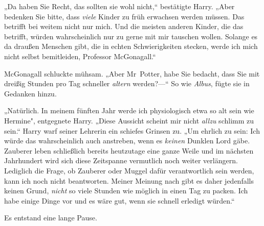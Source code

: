 „Da haben Sie Recht, das sollten sie wohl nicht,“ bestätigte Harry. „Aber bedenken Sie bitte, dass \emph{viele} Kinder zu früh erwachsen werden müssen. Das betrifft bei weitem nicht nur mich. Und die meisten anderen Kinder, die das betrifft, würden wahrscheinlich nur zu gerne mit mir tauschen wollen. Solange es da draußen Menschen gibt, die in echten Schwierigkeiten stecken, werde ich mich nicht selbst bemitleiden, Professor McGonagall.“

McGonagall schluckte mühsam. „Aber Mr~Potter, habe Sie bedacht, dass Sie mit dreißig Stunden pro Tag schneller \emph{altern} werden?—“ So wie \emph{Albus}, fügte sie in Gedanken hinzu.

„Natürlich. In meinem fünften Jahr werde ich physiologisch etwa so alt sein wie Hermine", entgegnete Harry. „Diese Aussicht scheint mir nicht \emph{allzu} schlimm zu sein.“ Harry warf seiner Lehrerin ein schiefes Grinsen zu. „Um ehrlich zu sein: Ich würde das wahrscheinlich auch anstreben, wenn es \emph{keinen} Dunklen Lord gäbe. Zauberer leben schließlich bereits heutzutage eine ganze Weile und im nächsten Jahrhundert wird sich diese Zeitspanne vermutlich noch weiter verlängern. Lediglich die Frage, ob Zauberer oder Muggel dafür verantwortlich sein werden, kann ich noch nicht beantworten. Meiner Meinung nach gibt es daher jedenfalls keinen Grund, \emph{nicht} so viele Stunden wie möglich in einen Tag zu packen. Ich habe einige Dinge vor und es wäre gut, wenn sie schnell erledigt würden.“

Es entstand eine lange Pause.

